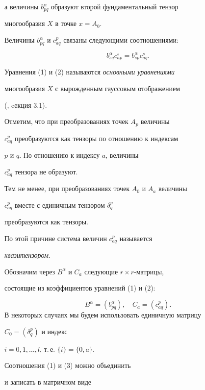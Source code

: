 а величины $b_{pq}^\alpha$ образуют второй фундаментальный тензор


многообразия $X$ в точке $x = A_0$.


Величины $b_{pq}^\alpha$ и $c^p_{aq}$ связаны следующими соотношениями:


\begin{equation}


\label{eq:7}


b_{sq}^\alpha c^s_{ap} = b_{sp}^\alpha c^s_{aq}.
\end{equation}



Уравнения (1) и (2) называются {\em основными уравнениями}


многообразия $X$ с вырожденным гауссовым отображением


(\cite{AG04}, cекция 3.1).





Отметим, что при преобразованиях точек $A_p$ величины


$c^p_{aq}$ преобразуются как тензоры по отношению к индексам


$p$ и $q$. По отношению к индексу $a$, величины


$c^p_{aq}$ тензора не образуют.


Тем не менее, при преобразованиях точек $A_0$ и $A_a$ величины


$c^p_{aq}$ вместе с единичным тензором $\delta_q^p$


преобразуются как тензоры.


По этой причине система величин $c^p_{aq}$ называется


{\em квазитензором}.





Обозначим через $B^\alpha$ и $C_a$ следующие $r \times r$-матрицы,


состоящие из коэффициентов уравнений (1) и (2):


$$


B^\alpha = (b^\alpha_{pq}),\quad C_a = ( c^p_{aq}).


$$
В некоторых случаях мы будем использовать единичную матрицу


$C_0 = (\delta^p_q)$ и индекс


$i = 0, 1, \dotsc, l$, т.\,е. $\{i\} = \{0, a\}$.


Соотношения (1) и (3) можно объединить


и записать в матричном виде


